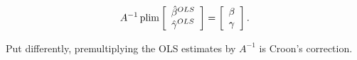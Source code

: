 \begin{equation}
A ^{-1} \operatorname{plim}  \left[ \begin{array}{c c}
                   \hat{\beta}^{OLS} \\
                    \hat{\gamma}^{OLS} \end{array} \right] = \left[ \begin{array}{c c}
                   \beta \\
                   \gamma \end{array} \right].
\end{equation}

\indent Put differently, premultiplying the OLS estimates by $A^{-1}$ is Croon's correction.